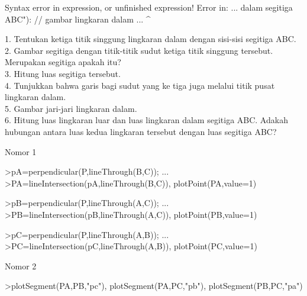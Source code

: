 \documentclass[a4paper,10pt]{article}
\begin{document}
\begin{eulernotebook}
\begin{eulercomment}
\begin{eulercomment}
\begin{euleroutput}
  Syntax error in expression, or unfinished expression!
  Error in:
  ...  dalam segitiga ABC"):  // gambar lingkaran dalam ...
                                                       ^
\end{euleroutput}
\begin{eulercomment}
1. Tentukan ketiga titik singgung lingkaran dalam dengan sisi-sisi
segitiga ABC.\\
2. Gambar segitiga dengan titik-titik sudut ketiga titik singgung
tersebut. Merupakan segitiga apakah itu?\\
3. Hitung luas segitiga tersebut.\\
4. Tunjukkan bahwa garis bagi sudut yang ke tiga juga melalui titik
pusat lingkaran dalam.\\
5. Gambar jari-jari lingkaran dalam.\\
6. Hitung luas lingkaran luar dan luas lingkaran dalam segitiga ABC.
Adakah hubungan antara luas kedua lingkaran tersebut dengan luas
segitiga ABC?\\
\end{eulercomment}
\eulersubheading{}
\begin{eulercomment}
Nomor 1
\end{eulercomment}
\begin{eulerprompt}
>pA=perpendicular(P,lineThrough(B,C));  ...
>PA=lineIntersection(pA,lineThrough(B,C)), plotPoint(PA,value=1)
\end{eulerprompt}
\begin{euleroutput}
  [0.632456,  1.31623]
\end{euleroutput}
\begin{eulerprompt}
>pB=perpendicular(P,lineThrough(A,C));  ...
>PB=lineIntersection(pB,lineThrough(A,C)), plotPoint(PB,value=1)
\end{eulerprompt}
\begin{euleroutput}
  [1.31623,  0.632456]
\end{euleroutput}
\begin{eulerprompt}
>pC=perpendicular(P,lineThrough(A,B));  ...
>PC=lineIntersection(pC,lineThrough(A,B)), plotPoint(PC,value=1)
\end{eulerprompt}
\begin{euleroutput}
  [0.5,  0.5]
\end{euleroutput}
\begin{eulercomment}
Nomor 2
\end{eulercomment}
\begin{eulerprompt}
>plotSegment(PA,PB,"pc"), plotSegment(PA,PC,"pb"), plotSegment(PB,PC,"pa")

\end{eulerprompt}
\end{eulercomment}
\end{eulercomment}
\end{eulernotebook}
\end{document}
